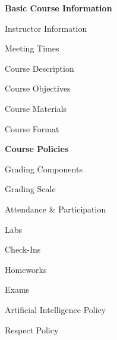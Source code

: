 \documentclass[11pt,letterpaper]{article}
\begin{document}
\mytitle


\begin{minipage}[t]{0.45\textwidth} %
{\bfseries\color{scred} Basic Course Information} \dotfill \pageref{course_info} \par
\hspace{0.3cm} Instructor Information \dotfill \pageref{instr_info} \par
\hspace{0.3cm} Meeting Times \dotfill \pageref{meetings} \par
\hspace{0.3cm} Course Description \dotfill \pageref{course_desc} \par
\hspace{0.3cm} Course Objectives \dotfill \pageref{course_obj} \par
\hspace{0.3cm} Course Materials \dotfill \pageref{course_mat} \par
\hspace{0.3cm} Course Format \dotfill \pageref{course_format} \par
{\bfseries\color{scred} Course Policies} \dotfill \pageref{course_policies} \par
\hspace{0.3cm} Grading Components \dotfill \pageref{grade_comp} \par
\hspace{0.3cm} Grading Scale \dotfill \pageref{grade_scale} \par
\hspace{0.3cm} Attendance \& Participation \dotfill \pageref{attend} \par
\hspace{0.3cm} Labs \dotfill \pageref{labs} \par
\hspace{0.3cm} Check-Ins \dotfill \pageref{check} \par
\hspace{0.3cm} Homeworks \dotfill \pageref{hw} \par
\hspace{0.3cm} Exams \dotfill \pageref{exams} \par
\hspace{0.3cm} Artificial Intelligence Policy \dotfill \pageref{ai_policy} \par
\hspace{0.3cm} Respect Policy \dotfill \pageref{respect} \par

\end{minipage}
\end{document}
